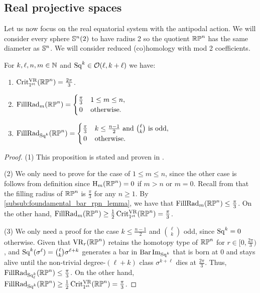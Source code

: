 
\subsection{Real projective spaces}\label{s:first_critical_value_rpn}
\label{sub:first_critical_value_rpn}

Let us now focus on the real equatorial system with the antipodal action.
We will consider every sphere \(\mathbb{S}^n(2)\) to have radius 2 so the quotient \(\mathbb{RP}^n\) has the same diameter as \(\mathbb{S}^n\).
We will consider reduced (co)homology with mod 2 coefficients.

\medskip\proposition
For \(k,\ell,n,m \in \mathbb{N}\) and \(\operatorname{Sq}^k \in \mathcal{O}(\ell, k+\ell)\) we have:
\begin{enumerate}
	\item \(\operatorname{Crit^{\mathrm{VR}}_{1^{\mathrm{st}}}}(\mathbb{RP}^n) = \frac{2\pi}{3}\).
	\item \(\firstdeath{m}{\rp^n} =
	\begin{cases}
		\frac{\pi}{3} & 1 \leq m \leq n, \\
		\hfil 0 & \text{otherwise}.
	\end{cases}\)
	\item \(\firstdeath{\Sq^k}{\rp^n} =
	\begin{cases}
		\tfrac{\pi}{3} & k \leq \frac{n-1}{2} \text{ and } \binom{\ell}{k} \text{ is odd},\\
		\hfil 0 & \text{otherwise}. \\
	\end{cases}\)
\end{enumerate}

\begin{proof}
	(1) This proposition is stated and proven in \cite[Thm.~4.5]{adams2022metric}.
	
	(2) We only need to prove for the case of $1\leq m\leq n$, since the other case is follows from definition since \(\mathrm{H}_m(\mathbb{RP}^n) = 0\) if \(m > n\) or \(m = 0\).
	Recall from \cite{katz1983filling} that the filling radius of $\mathbb{RP}^n$ is $\frac{\pi}{3}$ for any $n \geq 1$.
	By \cref{subsub:foundamental_bar_rpn_lemma}, we have that $\operatorname{FillRad}_{m}(\mathbb{RP}^n)\leq \tfrac{\pi}{3}$.
	On the other hand, $\operatorname{FillRad}_{m}(\mathbb{RP}^n)\geq \tfrac{1}{2}\operatorname{Crit^{\mathrm{VR}}_{1^{\mathrm{st}}}}(\mathbb{RP}^n) = \tfrac{\pi}{3}$.

	(3) We only need a proof for the case $k \leq \frac{n-1}{2}$ and $\binom{\ell}{k}$ odd, since \(\operatorname{Sq}^k = 0\) otherwise.
	Given that $\mathrm{VR}_r(\mathbb{RP}^n)$ retains the homotopy type of $\mathbb{RP}^n$ for $r \in [0,\tfrac{2\pi}{3})$,  and $\operatorname{Sq}^k(\sigma^\ell) = \binom{\ell}{k}\sigma^{\ell+k}$ generates a bar in $\operatorname{Bar} \operatorname{Im}_{\operatorname{Sq}^k}$ that is born at $0$ and stays alive until the non-trivial degree-$(\ell+k)$ class $\sigma^{k+\ell}$ dies at $\tfrac{2\pi}{3}$.
	Thus, $\operatorname{FillRad}_{\operatorname{Sq}_\ell^k}(\mathbb{RP}^n) \leq \tfrac{\pi}{3}$.
	On the other hand, $\operatorname{FillRad}_{\operatorname{Sq}^k}(\mathbb{RP}^n) \geq \tfrac{1}{2}\operatorname{Crit^{\mathrm{VR}}_{1^{\mathrm{st}}}}(\mathbb{RP}^n) = \tfrac{\pi}{3}$.
\end{proof}

